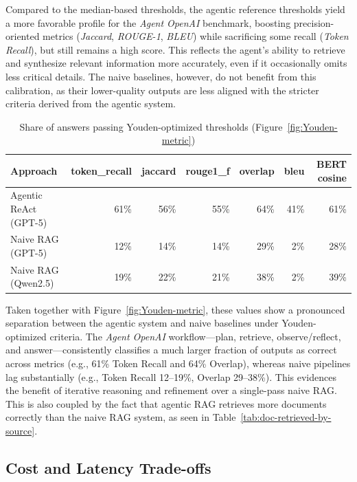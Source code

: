 Compared to the median-based thresholds, the agentic reference thresholds yield a more favorable profile for the \textit{Agent OpenAI} benchmark, boosting precision-oriented metrics (\textit{Jaccard}, \textit{ROUGE-1}, \textit{BLEU}) while sacrificing some recall (\textit{Token Recall}), but still remains a high score. This reflects the agent's ability to retrieve and synthesize relevant information more accurately, even if it occasionally omits less critical details. The naive baselines, however, do not benefit from this calibration, as their lower-quality outputs are less aligned with the stricter criteria derived from the agentic system.

\begin{table}[htbp]
    \centering
    \begin{tabular}{l r r r r r r}
        \hline
        Approach & token\_recall & jaccard & rouge1\_f & overlap & bleu & \gls{BERT} cosine \\
        \hline
        Agentic ReAct (\gls{GPT}-5) & 61\% & 56\% & 55\% & 64\% & 41\% & 61\% \\
        Naive \gls{RAG} (\gls{GPT}-5) & 12\% & 14\% & 14\% & 29\% & 2\% & 28\% \\
        Naive \gls{RAG} (Qwen2.5) & 19\% & 22\% & 21\% & 38\% & 2\% & 39\% \\
        \hline
    \end{tabular}
    \caption{Share of answers passing Youden-optimized thresholds (Figure~\ref{fig:Youden-metric})}
    \label{tab:youden-metric-values}
\end{table}

Taken together with Figure~\ref{fig:Youden-metric}, these values show a pronounced separation between the agentic system and naive baselines under Youden-optimized criteria. The \textit{Agent OpenAI} workflow—plan, retrieve, observe/reflect, and answer—consistently classifies a much larger fraction of outputs as correct across metrics (e.g., 61\% Token Recall and 64\% Overlap), whereas naive pipelines lag substantially (e.g., Token Recall 12–19\%, Overlap 29–38\%). This evidences the benefit of iterative reasoning and refinement over a single-pass naive RAG. This is also coupled by the fact that agentic RAG retrieves more documents correctly than the naive RAG system, as seen in Table~\ref{tab:doc-retrieved-by-source}.

\subsection{Cost and Latency Trade-offs}

